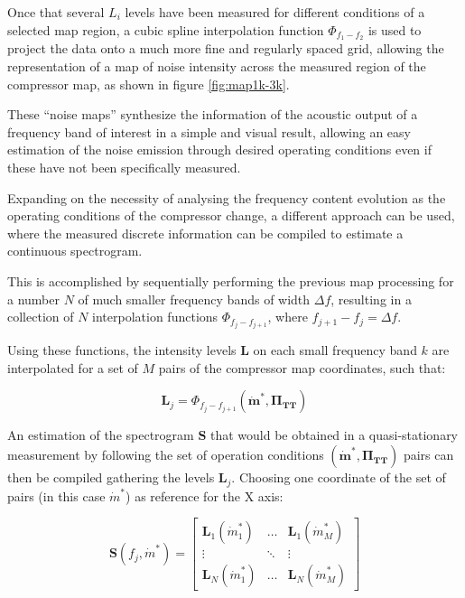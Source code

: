 Once that several $L_i$ levels have been measured for different conditions of a selected map region, a cubic spline interpolation function $\Phi_{f_1-f_2}$ is used to project the data onto a much more fine and regularly spaced grid, allowing the representation of a map of noise intensity across the measured region of the compressor map, as shown in figure \ref{fig:map1k-3k}.

These ``noise maps'' synthesize the information of the acoustic output of a frequency band of interest in a simple and visual result, allowing an easy estimation of the noise emission through desired operating conditions even if these have not been specifically measured.

Expanding on the necessity of analysing the frequency content evolution as the operating conditions of the compressor change, a different approach can be used, where the measured discrete information can be compiled to estimate a continuous spectrogram.

This is accomplished by sequentially performing the previous map processing for a number $N$ of much smaller frequency bands of width $\Delta f$, resulting in a collection of $N$ interpolation functions $\Phi_{f_j-f_{j+1}}$, where $f_{j+1}-f_j = \Delta f$.

Using these functions, the intensity levels $\mathbf L$ on each small frequency band $k$ are interpolated for a set of $M$ pairs of the compressor map coordinates, such that:

\begin{equation}
 \mathbf L_j=\Phi_{f_j-f_{j+1}}(\bm{\dot m^*},\bm{\Pi_\text{TT}})
\end{equation}

An estimation of the spectrogram $\mathbf S$ that would be obtained in a quasi-stationary measurement by following the set of operation conditions $(\bm{\dot m^*},\bm{\Pi_\text{TT}})$ pairs can then be compiled gathering the levels $\mathbf L_j$. Choosing one coordinate of the set of pairs (in this case $\dot m^*$) as reference for the X axis:

\begin{equation}
  \mathbf S(f_j,\dot m^*)=\begin{bmatrix}
    \mathbf L_1(\dot m^*_1) & \hdots & \mathbf L_1(\dot m^*_M)\\
    \vdots & \ddots & \vdots \\
    \mathbf L_N(\dot m^*_1) & \hdots & \mathbf L_N(\dot m^*_M)
  \end{bmatrix}
\end{equation}

